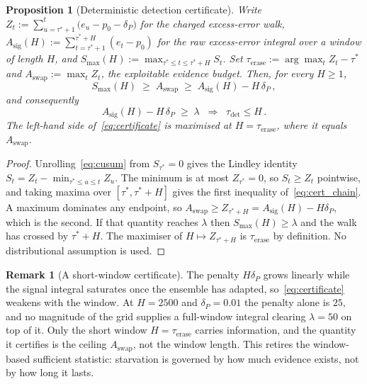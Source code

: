\documentclass[10pt,conference]{IEEEtran}
\newtheorem{proposition}[theorem]{Proposition}
\theoremstyle{definition}
\newtheorem{remark}[theorem]{Remark}
\newcommand{\SixHorizon}{2500}               %
\newcommand{\DeltaPtext}{0.01}               %
\begin{document}
\begin{proposition}[Deterministic detection certificate]\label{prop:certificate}
  Write $Z_t := \sum_{u = \tau^*+1}^{t}\bigl(e_u - p_0 - \delta_P\bigr)$ for the charged excess-error walk, $A_{\mathrm{sig}}(H) := \sum_{t = \tau^*+1}^{\tau^*+H}(e_t - p_0)$ for the raw excess-error integral over a window of length $H$, and $S_{\max}(H) := \max_{\tau^* \le t \le \tau^*+H} S_t$. Set $\tau_{\mathrm{erase}} := \arg\max_{t} Z_t - \tau^*$ and $A_{\mathrm{swap}} := \max_t Z_t$, the exploitable evidence budget. Then, for every $H \ge 1$,
  \begin{equation}\label{eq:cert_chain}
    S_{\max}(H) \;\ge\; A_{\mathrm{swap}} \;\ge\; A_{\mathrm{sig}}(H) - H\,\delta_P\,,
  \end{equation}
  and consequently
  \begin{equation}\label{eq:certificate}
    A_{\mathrm{sig}}(H) - H\,\delta_P \;\ge\; \lambda \;\;\Longrightarrow\;\; \tau_{\mathrm{det}} \le H\,.
  \end{equation}
  The left-hand side of~\eqref{eq:certificate} is maximised at $H = \tau_{\mathrm{erase}}$, where it equals $A_{\mathrm{swap}}$.
\end{proposition}

\begin{proof}
  Unrolling~\eqref{eq:cusum} from $S_{\tau^*} = 0$ gives the Lindley identity $S_t = Z_t - \min_{\tau^* \le u \le t} Z_u$. The minimum is at most $Z_{\tau^*} = 0$, so $S_t \ge Z_t$ pointwise, and taking maxima over $[\tau^*, \tau^*+H]$ gives the first inequality of~\eqref{eq:cert_chain}. A maximum dominates any endpoint, so $A_{\mathrm{swap}} \ge Z_{\tau^*+H} = A_{\mathrm{sig}}(H) - H\delta_P$, which is the second. If that quantity reaches $\lambda$ then $S_{\max}(H) \ge \lambda$ and the walk has crossed by $\tau^*+H$. The maximiser of $H \mapsto Z_{\tau^*+H}$ is $\tau_{\mathrm{erase}}$ by definition. No distributional assumption is used.
\end{proof}

\begin{remark}[A short-window certificate]\label{rem:shortwindow}
  The penalty $H\delta_P$ grows linearly while the signal integral saturates once the ensemble has adapted, so~\eqref{eq:certificate} weakens with the window. At $H = \SixHorizon$ and $\delta_P = \DeltaPtext$ the penalty alone is $25$, and no magnitude of the grid supplies a full-window integral clearing $\lambda = 50$ on top of it. Only the short window $H = \tau_{\mathrm{erase}}$ carries information, and the quantity it certifies is the ceiling $A_{\mathrm{swap}}$, not the window length. This retires the window-based sufficient statistic: starvation is governed by how much evidence exists, not by how long it lasts.
\end{remark}
\end{document}
